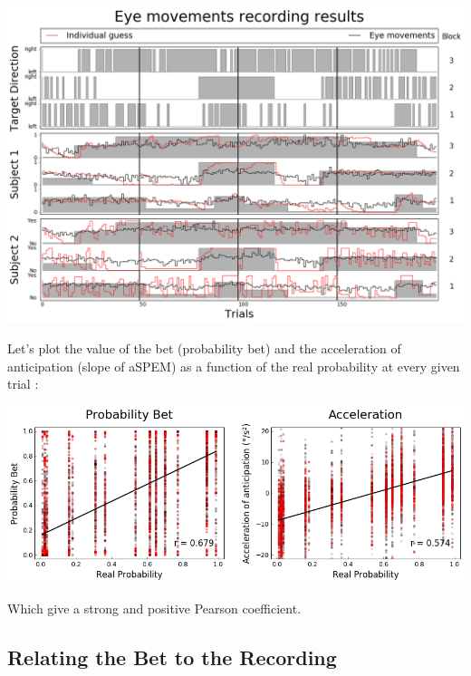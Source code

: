 \documentclass[profile,final,english, draft]{article}%
\begin{document}
\begin{center}
    \includegraphics[width=1\linewidth]{results_enregistrement}
\end{center}



Let's plot the value of the bet (probability bet)  and the acceleration of anticipation (slope of aSPEM) as a function of the real probability at every given trial :

\begin{center} 
    \includegraphics[width=1\linewidth]{P_real}
\end{center}

Which give a strong and positive Pearson coefficient.

\subsection*{Relating the Bet to the Recording}
\end{document}
